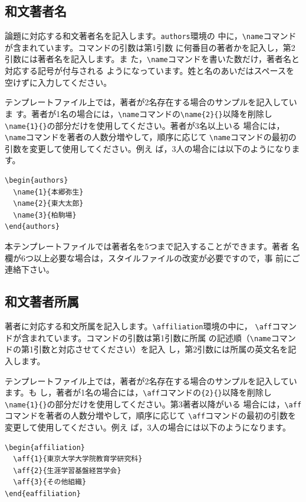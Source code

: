 \documentclass[b5paper,10pt,twocolumn,tombow]{jarticle}
\begin{document}
\subsection{和文著者名}
論題に対応する和文著者名を記入します。\texttt{authors}環境の
中に，\verb|\name|コマンドが含まれています。コマンドの引数は第1引数
に何番目の著者かを記入し，第2引数には著者名を記入します。ま
た，\verb|\name|コマンドを書いた数だけ，著者名と対応する記号が付与される
ようになっています。姓と名のあいだはスペースを空けずに入力してください。

テンプレートファイル上では，著者が2名存在する場合のサンプルを記入していま
す。著者が1名の場合には，\verb|\name|コマンドの\verb|\name{2}{}|以降を削除し
\verb|\name{1}{}|の部分だけを使用してください。著者が3名以上いる
場合には，\verb|\name|コマンドを著者の人数分増やして，順序に応じて
\verb|\name|コマンドの最初の引数を変更して使用してください。例え
ば，3人の場合には以下のようになります。
\begin{verbatim}
\begin{authors}
  \name{1}{本郷弥生}
  \name{2}{東大太郎}
  \name{3}{柏駒場}
\end{authors}
\end{verbatim}
本テンプレートファイルでは著者名を5つまで記入することができます。著者
名欄が6つ以上必要な場合は，スタイルファイルの改変が必要ですので，事
前にご連絡下さい。


\subsection{和文著者所属}
著者に対応する和文所属を記入します。\verb|\affiliation|環境の中に，
\verb|\aff|コマンドが含まれています。コマンドの引数は第1引数に所属
の記述順（\verb|\name|コマンドの第1引数と対応させてください）を記入
し，第2引数には所属の英文名を記入します。


テンプレートファイル上では，著者が2名存在する場合のサンプルを記入しています。も
し，著者が1名の場合には，\verb|\aff|コマンドの\verb|{2}{}|以降を削除し
\verb|\name{1}{}|の部分だけを使用してください。第3著者以降がいる
場合には，\verb|\aff|コマンドを著者の人数分増やして，順序に応じて
\verb|\aff|コマンドの最初の引数を変更して使用してください。例え
ば，3人の場合には以下のようになります。

\begin{verbatim}
\begin{affiliation}
  \aff{1}{東京大学大学院教育学研究科}
  \aff{2}{生涯学習基盤経営学会}
  \aff{3}{その他組織}
\end{eaffiliation}
\end{verbatim}
\end{document}

